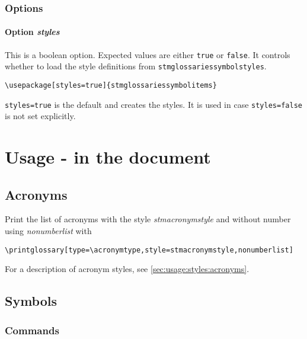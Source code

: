 \documentclass{scrartcl}
\begin{document}
\subsubsection{Options}

\paragraph{Option \protect\textit{styles}}

This is a boolean option. Expected values are either \texttt{true} or \texttt{false}. It controls whether to load the style definitions from \texttt{stmglossariessymbolstyles}.

\begin{verbatim}
\usepackage[styles=true]{stmglossariessymbolitems}
\end{verbatim}

\texttt{styles=true} is the default and creates the styles. It is used in case \texttt{styles=false} is not set explicitly.

\section{Usage - in the document}
\label{sec:usage:document}

\subsection{Acronyms}
\label{sec:usage:document:acronyms}

Print the list of acronyms with the style \textit{stmacronymstyle} and without number using \textit{nonumberlist} with

\begin{verbatim}
\printglossary[type=\acronymtype,style=stmacronymstyle,nonumberlist]
\end{verbatim}

For a description of acronym styles, see \autoref{sec:usage:styles:acronyms}.

\subsection{Symbols}
\label{sec:usage:document:symbols}

\subsubsection{Commands}
\label{sec:usage:document:symbols:commands}
\end{document}
